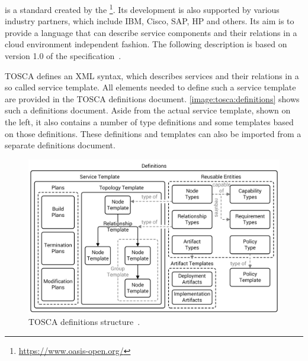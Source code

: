  is a standard created by the \footnote{\url{https://www.oasis-open.org/}}.
Its development is also supported by various industry partners, which include IBM, Cisco, SAP, HP and others.
Its aim is to provide a language that can describe service components and their relations in a cloud environment independent fashion.
The following description is based on version 1.0 of the specification~\autocite{tosca:spec}.

TOSCA defines an XML syntax, which describes services and their relations in a so called service template.
All elements needed to define such a service template are provided in the TOSCA definitions document.
\autoref{image:tosca:definitions} shows such a definitions document.
Aside from the actual service template, shown on the left, it also contains a number of type definitions and some templates based on those definitions.
These definitions and templates can also be imported from a separate definitions document.

\begin{figure}[!htbp]
	\centering
	\includegraphics[resolution=600]{fundamentals/assets/definitions}
	\caption{TOSCA definitions structure~\autocite[based on][]{tosca:spec}.}
	\label{image:tosca:definitions}
\end{figure}

